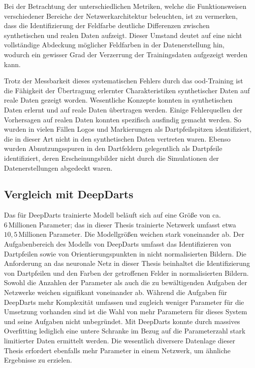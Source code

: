 Bei der Betrachtung der unterschiedlichen Metriken, welche die Funktionsweisen verschiedener Bereiche der Netzwerkarchitektur beleuchten, ist zu vermerken, dass die Identifizierung der Feldfarbe deutliche Differenzen zwischen synthetischen und realen Daten aufzeigt. Dieser Umstand deutet auf eine nicht vollständige Abdeckung möglicher Feldfarben in der Datenerstellung hin, wodurch ein gewisser Grad der Verzerrung der Trainingsdaten aufgezeigt werden kann.

Trotz der Messbarkeit dieses systematischen Fehlers durch das \ac{ood}-Training ist die Fähigkeit der Übertragung erlernter Charakteristiken synthetischer Daten auf reale Daten gezeigt worden. Wesentliche Konzepte konnten in synthetischen Daten erlernt und auf reale Daten übertragen werden. Einige Fehlerquellen der Vorhersagen auf realen Daten konnten spezifisch ausfindig gemacht werden. So wurden in vielen Fällen Logos und Markierungen als Dartpfeilspitzen identifiziert, die in dieser Art nicht in den synthetischen Daten vertreten waren. Ebenso wurden Abnutzungsspuren in den Dartfeldern gelegentlich als Dartpfeile identifiziert, deren Erscheinungsbilder nicht durch die Simulationen der Datenerstellungen abgedeckt waren.


\subsection{Vergleich mit DeepDarts}

Das für DeepDarts trainierte Modell beläuft sich auf eine Größe von ca. $6\,\text{Millionen}$ Parameter; das in dieser Thesis trainierte Netzwerk umfasst etwa $10,5\,\text{Millionen}$ Parameter. Die Modellgrößen weichen stark voneinander ab. Der Aufgabenbereich des Modells von DeepDarts umfasst das Identifizieren von Dartpfeilen sowie von Orientierungspunkten in nicht normalisierten Bildern. Die Anforderung an das neuronale Netz in dieser Thesis beinhaltet die Identifizierung von Dartpfeilen und den Farben der getroffenen Felder in normalisierten Bildern. Sowohl die Anzahlen der Parameter als auch die zu bewältigenden Aufgaben der Netzwerke weichen signifikant voneinander ab. Während die Aufgaben für DeepDarts mehr Komplexität umfassen und zugleich weniger Parameter für die Umsetzung vorhanden sind ist die Wahl von mehr Parametern für dieses System und seine Aufgaben nicht unbegründet. Mit DeepDarts konnte durch massives Overfitting lediglich eine untere Schranke im Bezug auf die Parameterzahl stark limitierter Daten ermittelt werden. Die wesentlich diversere Datenlage dieser Thesis erfordert ebenfalls mehr Parameter in einem Netzwerk, um ähnliche Ergebnisse zu erzielen.


